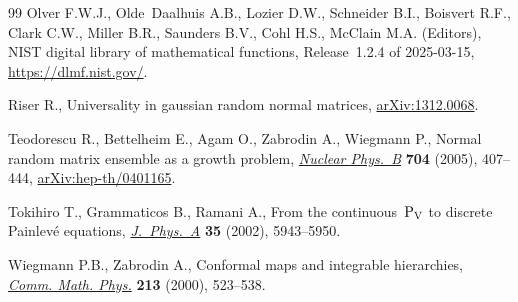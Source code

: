 \begin{thebibliography}{99}
Olver F.W.J., Olde~Daalhuis A.B., Lozier D.W., Schneider B.I., Boisvert R.F.,
 Clark C.W., Miller B.R., Saunders B.V., Cohl H.S., McClain M.A. (Editors), {NIST}
 digital library of mathematical functions, {R}elease~1.2.4 of 2025-03-15,
 \url{https://dlmf.nist.gov/}.

Riser R., Universality in gaussian random normal matrices,
 \href{http://arxiv.org/abs/1312.0068}{arXiv:1312.0068}.

Teodorescu R., Bettelheim E., Agam O., Zabrodin A., Wiegmann P., Normal random
 matrix ensemble as a growth problem,
 \href{https://doi.org/10.1016/j.nuclphysb.2004.10.006}{\textit{Nuclear
 Phys.~B}} \textbf{704} (2005), 407--444,
 \href{http://arxiv.org/abs/hep-th/0401165}{arXiv:hep-th/0401165}.

Tokihiro T., Grammaticos B., Ramani A., From the continuous~{$\rm P_V$} to
 discrete {P}ainlev\'e equations,
 \href{https://doi.org/10.1088/0305-4470/35/28/312}{\textit{J.~Phys.~A}}
 \textbf{35} (2002), 5943--5950.

Wiegmann P.B., Zabrodin A., Conformal maps and integrable hierarchies,
 \href{https://doi.org/10.1007/s002200000249}{\textit{Comm. Math. Phys.}}
 \textbf{213} (2000), 523--538.

\end{thebibliography}
